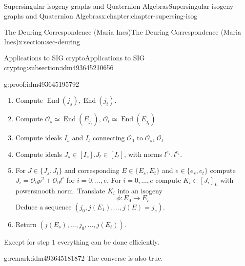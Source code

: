 \documentclass[oneside,10pt,]{book}
\numberwithin{equation}{section}
\newcommand{\lb}{[}
\newcommand{\rb}{]}
\newcommand{\ints}{\mathcal{O}}
\DeclareMathOperator{\End}{End}
\begin{document}
\begin{chapterptx}{Supersingular isogeny graphs and Quaternion Algebras}{}{Supersingular isogeny graphs and Quaternion Algebras}{}{}{x:chapter:chapter-supersing-isog}
\begin{sectionptx}{The Deuring Correspondence (Maria Ines)}{}{The Deuring Correspondence (Maria Ines)}{}{}{x:section:sec-deuring}
\begin{subsectionptx}{Applications to SIG crypto}{}{Applications to SIG crypto}{}{}{g:subsection:idm493645210656}
\begin{proofptx}{}{g:proof:idm493645195792}
\begin{enumerate}
\item{}Compute \(\End(j_s),\End(j_t)\).%
\item{}Compute \(\ints_s \simeq \End(E_{j_s})\), \(\ints_t \simeq \End(E_{j_t})\)%
\item{}Compute ideals \(I_s\) and \(I_t\) connecting \(\ints_0 \) to \(\ints_s\), \(\ints_t\)%
\item{}Compute ideals \(J_s \in \lb I_s \rb\),\(J_t \in \lb I_t \rb\), with norms \(l^{e_s},l^{e_t}\).%
\item{}For \(J \in \{J_s,J_t\}\) and corresponding \(E \in \{E_s,E_t\}\) and \(e\in \{e_s, e_t\}\) compute \(J_i = \ints_0 p^2 + \ints_0 l^i\) for \(i = 0,\ldots, e\). For \(i = 0,\ldots, e\) compute \(K_i \in \lb J_i \rb_L\) with powersmooth norm. Translate \(K_i\) into an isogeny%
\begin{equation*}
\phi\colon E_0 \to E_i
\end{equation*}
Deduce a sequence \((j_0, j(E_1),\ldots,j(E) = j_e)\).%
\item{}Return \((j(E_s), \ldots,j_0, \ldots,j(E_t))\).%
\end{enumerate}
%
\par
Except for step 1 everything can be done efficiently.%
\end{proofptx}
\begin{remark}{}{g:remark:idm493645181872}%
The converse is also true.%
\end{remark}
\end{subsectionptx}
\end{sectionptx}
\end{chapterptx}
%
%
\typeout{************************************************}
\typeout{************************************************}
%
\end{document}
